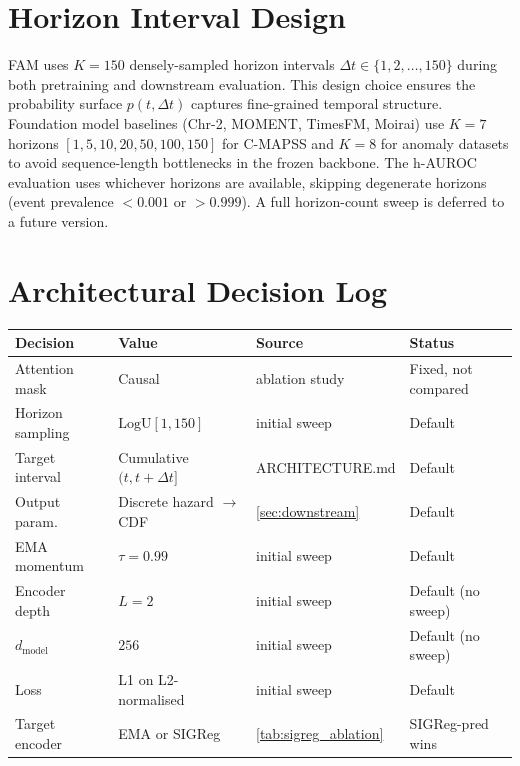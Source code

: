 \documentclass{article}
\begin{document}



\appendix



\section{Horizon Interval Design}
\label{app:horizon_sensitivity}

FAM uses $K = 150$ densely-sampled horizon intervals $\Delta t \in \{1, 2, \ldots, 150\}$ during both pretraining and downstream evaluation. This design choice ensures the probability surface $p(t, \Delta t)$ captures fine-grained temporal structure. Foundation model baselines (Chr-2, MOMENT, TimesFM, Moirai) use $K = 7$ horizons $[1, 5, 10, 20, 50, 100, 150]$ for C-MAPSS and $K = 8$ for anomaly datasets to avoid sequence-length bottlenecks in the frozen backbone. The h-AUROC evaluation uses whichever horizons are available, skipping degenerate horizons (event prevalence $< 0.001$ or $> 0.999$). A full horizon-count sweep is deferred to a future version.

\section{Architectural Decision Log}
\label{app:decisions}

\begin{center}
  \small
  \begin{tabular}{llll}
    \toprule
    Decision         & Value                          & Source                     & Status              \\
    \midrule
    Attention mask   & Causal                         & ablation study             & Fixed, not compared \\
    Horizon sampling & $\text{LogU}[1, 150]$          & initial sweep              & Default             \\
    Target interval  & Cumulative $(t, t{+}\Delta t]$ & ARCHITECTURE.md            & Default             \\
    Output param.    & Discrete hazard $\to$ CDF      & \cref{sec:downstream}      & Default             \\
    EMA momentum     & $\tau = 0.99$                  & initial sweep              & Default             \\
    Encoder depth    & $L = 2$                        & initial sweep              & Default (no sweep)  \\
    $d_\text{model}$ & $256$                          & initial sweep              & Default (no sweep)  \\
    Loss             & L1 on L2-normalised            & initial sweep              & Default             \\
    Target encoder   & EMA or SIGReg                  & \cref{tab:sigreg_ablation} & SIGReg-pred wins    \\
    \bottomrule
  \end{tabular}
\end{center}
\end{document}
